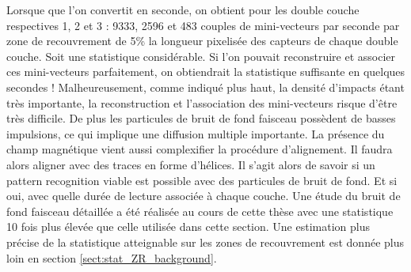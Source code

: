   \medskip

  Lorsque que l'on convertit en seconde, on obtient pour les double couche respectives 1, 2 et 3 : 9333, 2596 et 483 couples de mini-vecteurs par seconde par zone de recouvrement de 5\% la longueur pixelis\'ee des capteurs de chaque double couche. Soit une statistique consid\'erable. Si l'on pouvait reconstruire et associer ces mini-vecteurs parfaitement, on obtiendrait la statistique suffisante en quelques secondes ! Malheureusement, comme indiqu\'e plus haut, la densit\'e d'impacts \'etant tr\`es importante, la reconstruction et l'association des mini-vecteurs risque d'\^etre tr\`es difficile. De plus les particules de bruit de fond faisceau poss\`edent de basses impulsions, ce qui implique une diffusion multiple importante. La pr\'esence du champ magn\'etique vient aussi complexifier la proc\'edure d'alignement. Il faudra alors aligner avec des traces en forme d'h\'elices. Il s'agit alors de savoir si un pattern recognition viable est possible avec des particules de bruit de fond. Et si oui, avec quelle dur\'ee de lecture associ\'ee \`a chaque couche. Une \'etude du bruit de fond faisceau d\'etaill\'ee a \'et\'e r\'ealis\'ee au cours de cette th\`ese avec une statistique 10 fois plus \'elev\'ee que celle utilis\'ee dans cette section. Une estimation plus pr\'ecise de la statistique atteignable sur les zones de recouvrement est donn\'ee plus loin en section \ref{sect:stat_ZR_background}.
  
  
  
